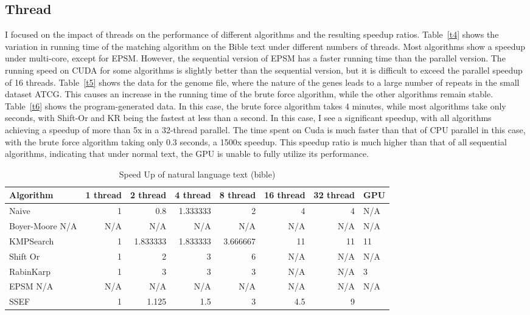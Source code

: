 \documentclass[11pt]{article}       %
\begin{document}
\subsection{Thread}\label{tf}

I focused on the impact of threads on the performance of different algorithms and the resulting speedup ratios. Table~\ref{t4} shows the variation in running time of the matching algorithm on the Bible text under different numbers of threads. Most algorithms show a speedup under multi-core, except for EPSM. However, the sequential version of EPSM has a faster running time than the parallel version. The running speed on CUDA for some algorithms is slightly better than the sequential version, but it is difficult to exceed the parallel speedup of 16 threads. Table~\ref{t5} shows the data for the genome file, where the nature of the genes leads to a large number of repeats in the small dataset {ATCG}. This causes an increase in the running time of the brute force algorithm, while the other algorithms remain stable. Table~\ref{t6} shows the program-generated data. In this case, the brute force algorithm takes 4 minutes, while most algorithms take only seconds, with Shift-Or and KR being the fastest at less than a second. In this case, I see a significant speedup, with all algorithms achieving a speedup of more than 5x in a 32-thread parallel. The time spent on Cuda is much faster than that of CPU parallel in this case, with the brute force algorithm taking only 0.3 seconds, a 1500x speedup. This speedup ratio is much higher than that of all sequential algorithms, indicating that under normal text, the GPU is unable to fully utilize its performance.




\begin{table}[htbp]
  \centering
  \caption{Speed Up of natural language text (bible)}
    \begin{tabular}{lrrrrrr}\label{t7}
Algorithm & 1 thread & 2 thread & 4 thread & 8 thread & 16 thread & 32 thread & GPU \\
 \hline
    Naive & 1     & 0.8   & 1.333333 & 2     & 4     & 4     &  N/A \\
    {Boyer-Moore} N/A &  N/A     &  N/A     &  N/A     &  N/A     &  N/A     &  N/A     &  N/A \\
    KMPSearch & 1     & 1.833333 & 1.833333 & 3.666667 & 11    & 11    & 11 \\
    Shift Or & 1     & 2     & 3     & 6     &    N/A   &    N/A    &  N/A \\
    RabinKarp & 1     & 3     & 3     & 3     &    N/A    &     N/A   & 3 \\
    EPSM  N/A &  N/A     & N/A     &  N/A     &  N/A     &  N/A    &  N/A   &  N/A \\
    SSEF  & 1     & 1.125 & 1.5   & 3     & 4.5   & 9     &  \\
    \end{tabular}%
  \label{tab:addlabel}%
\end{table}%
\end{document}
